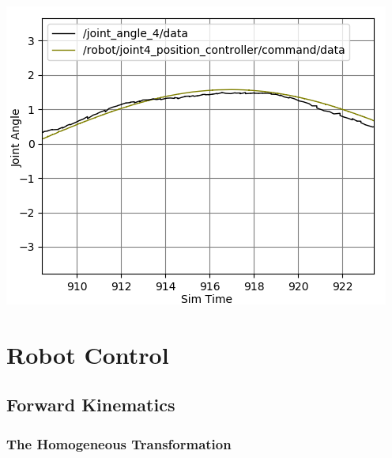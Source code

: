 \documentclass[11pt]{article}
\begin{document}
\begin{center}
\begin{minipage}{0.33\linewidth}
\includegraphics[width=\linewidth]{fig_with_axisname/2.2-joint4.png}
\end{minipage}
\end{center}

\section{Robot Control}

\subsection{Forward Kinematics}

\subsubsection{The Homogeneous Transformation}
\end{document}
